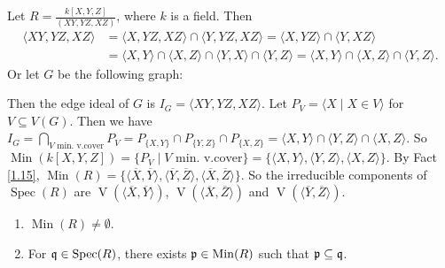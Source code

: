 \begin{example}\label{2.43}
    Let $R = \frac{k[X,Y,Z]}{(XY,YZ,XZ)}$, where $k$ is a field. Then 
    \begin{align*}
        \langle XY,YZ,XZ \rangle &= \langle X,YZ,XZ \rangle \cap \langle Y,YZ,XZ \rangle = \langle X,YZ \rangle \cap \langle Y,XZ \rangle \\
        &= \langle X,Y \rangle \cap \langle X,Z \rangle \cap \langle Y,X \rangle \cap \langle Y,Z \rangle = \langle X,Y \rangle \cap \langle X,Z \rangle \cap \langle Y,Z \rangle.
    \end{align*}
    Or let $G$ be the following graph: 
    \begin{center}
    \end{center}
    Then the edge ideal of $G$ is $I_G = \langle XY,YZ,XZ \rangle$. Let $P_V = \langle X \mid X \in V \rangle$ for $V \subseteq V(G)$. Then we have $I_G = \bigcap_{V\text{ min. v.cover}} P_V = P_{\{X,Y\}} \cap P_{\{Y,Z\}} \cap P_{\{X,Z\}} = \langle X,Y \rangle \cap \langle Y,Z \rangle \cap \langle X,Z \rangle$. So $\operatorname{Min}(k[X,Y,Z]) = \{P_V \mid V \text{ min. v.cover}\} = \{\langle X,Y \rangle, \langle Y,Z \rangle, \langle X,Z \rangle\}$. By Fact \ref{1.15}, $\operatorname{Min}(R) = \{\langle \overbar{X},\overbar{Y} \rangle, \langle \overbar{Y},\overbar{Z} \rangle, \langle \overbar{X}, \overbar{Z} \rangle \}$. So the irreducible components of $\operatorname{Spec}(R)$ are $\operatorname{V}(\langle \overbar X,\overbar Y \rangle)$, $\operatorname{V}(\langle \overbar X, \overbar Z \rangle)$ and $\operatorname{V}(\langle \overbar Y,\overbar Z \rangle)$.
\end{example}

\begin{corollary}\label{2.44}
    \begin{enumerate}
        \item $\operatorname{Min}(R) \neq \emptyset$.
        \item For $\mathfrak{q} \in \operatorname{Spec}(R)$, there exists $\mathfrak{p} \in \operatorname{Min}(R)$ such that $\mathfrak{p} \subseteq \mathfrak{q}$.
    \end{enumerate}
\end{corollary}

